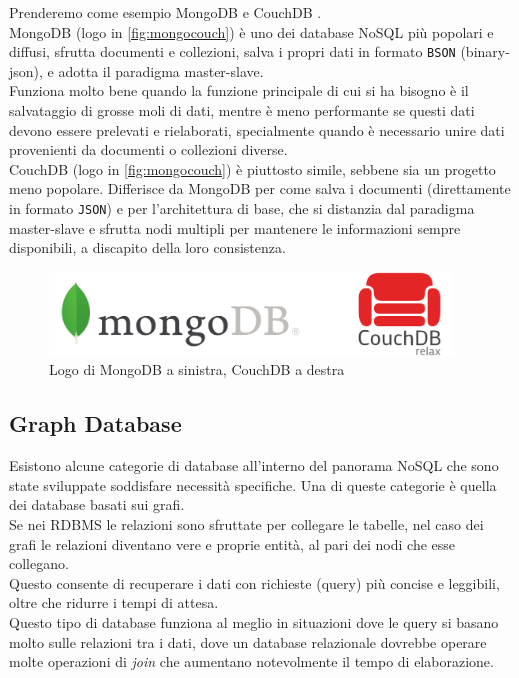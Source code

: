 \noindent Prenderemo come esempio MongoDB \cite{site:udemymongodb} e CouchDB \cite{site:udemycouchdb}.\\
MongoDB (logo in \autoref{fig:mongocouch}) è uno dei database NoSQL più popolari e diffusi, sfrutta documenti e collezioni, salva i propri dati in formato \texttt{BSON} (binary-json), e adotta il paradigma \gls{master-slave}.\\
Funziona molto bene quando la funzione principale di cui si ha bisogno è il salvataggio di grosse moli di dati, mentre è meno performante se questi dati devono essere prelevati e rielaborati, specialmente quando è necessario unire dati provenienti da documenti o collezioni diverse.\\
CouchDB (logo in \autoref{fig:mongocouch}) è piuttosto simile, sebbene sia un progetto meno popolare. Differisce da MongoDB per come salva i documenti (direttamente in formato \texttt{JSON}) e per l'architettura di base, che si distanzia dal paradigma \gls{master-slave} e sfrutta nodi multipli per mantenere le informazioni sempre disponibili, a discapito della loro consistenza.

\begin{figure}[htbp]
\begin{center}
\includegraphics[height=6em]{immagini/tecnologies-logos/MongoDB-CouchDB-Logo.png}
\caption{Logo di MongoDB a sinistra, CouchDB a destra}
\label{fig:mongocouch}
\end{center}
\end{figure}

\subsection{Graph Database}
Esistono alcune categorie di database all'interno del panorama NoSQL che sono state sviluppate soddisfare necessità specifiche. Una di queste categorie è quella dei database basati sui grafi.\\
Se nei RDBMS le relazioni sono sfruttate per collegare le tabelle, nel caso dei grafi le relazioni diventano vere e proprie entità, al pari dei nodi che esse collegano.\\
Questo consente di recuperare i dati con richieste (query) più concise e leggibili, oltre che ridurre i tempi di attesa.\\
Questo tipo di database funziona al meglio in situazioni dove le query si basano molto sulle relazioni tra i dati, dove un database relazionale dovrebbe operare molte operazioni di \textit{join} che aumentano notevolmente il tempo di elaborazione.\\

